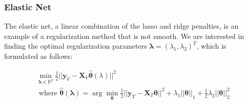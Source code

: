 \documentclass[10pt,letterpaper]{article}
\begin{document}
%



\subsubsection{Elastic Net}

The elastic net, a linear combination of the lasso and ridge penalties, is an example of a regularization method that is not smooth. We are interested in finding the optimal regularization parameters $\boldsymbol{\lambda} = (\lambda_1, \lambda_2)^T$, which is formulated as follows:

\begin{equation}
\begin{array}{c}
\min_{\boldsymbol{\lambda} \in \mathbb{R}^2} \frac{1}{2} \lvert\lvert \boldsymbol{y}_V - \boldsymbol{X}_V \hat{\boldsymbol{\theta}} (\lambda) \rvert\rvert ^2 \\
\text{ where }
\hat{\boldsymbol{\theta}} (\boldsymbol{\lambda}) = \arg \min_{\boldsymbol{\theta}} \frac{1}{2} \lvert\lvert \boldsymbol{y}_T - \boldsymbol{X}_T \boldsymbol{\theta} \rvert\rvert ^2
+ \lambda_1 \lvert\lvert \boldsymbol{\theta} \rvert \rvert_1
+ \frac{1}{2}\lambda_2 \lvert\lvert \boldsymbol{\theta} \rvert \rvert_2^2
\end{array}
\end{equation}
\end{document}
